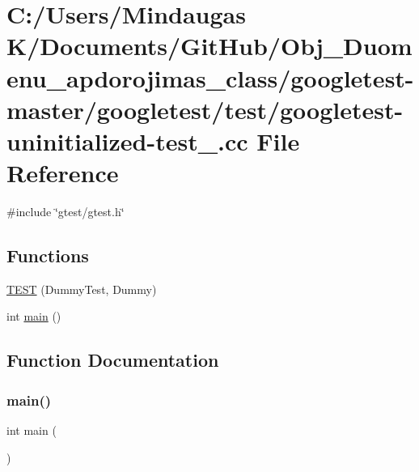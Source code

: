 \hypertarget{googletest-master_2googletest_2test_2googletest-uninitialized-test___8cc}{}\section{C\+:/\+Users/\+Mindaugas K/\+Documents/\+Git\+Hub/\+Obj\+\_\+\+Duomenu\+\_\+apdorojimas\+\_\+class/googletest-\/master/googletest/test/googletest-\/uninitialized-\/test\+\_\+.cc File Reference}
\label{googletest-master_2googletest_2test_2googletest-uninitialized-test___8cc}
{\ttfamily \#include \char`\"{}gtest/gtest.\+h\char`\"{}}\newline
\subsection*{Functions}
\begin{DoxyCompactItemize}
\item 
\mbox{\hyperlink{googletest-master_2googletest_2test_2googletest-uninitialized-test___8cc_a63812c9ef0cbc6907a251ccf919da78e}{T\+E\+ST}} (Dummy\+Test, Dummy)
\item 
int \mbox{\hyperlink{googletest-master_2googletest_2test_2googletest-uninitialized-test___8cc_ae66f6b31b5ad750f1fe042a706a4e3d4}{main}} ()
\end{DoxyCompactItemize}


\subsection{Function Documentation}
\mbox{\label{googletest-master_2googletest_2test_2googletest-uninitialized-test___8cc_ae66f6b31b5ad750f1fe042a706a4e3d4}} 
\subsubsection{\texorpdfstring{main()}{main()}}
{\footnotesize\ttfamily int main (\begin{DoxyParamCaption}{ }\end{DoxyParamCaption})}

